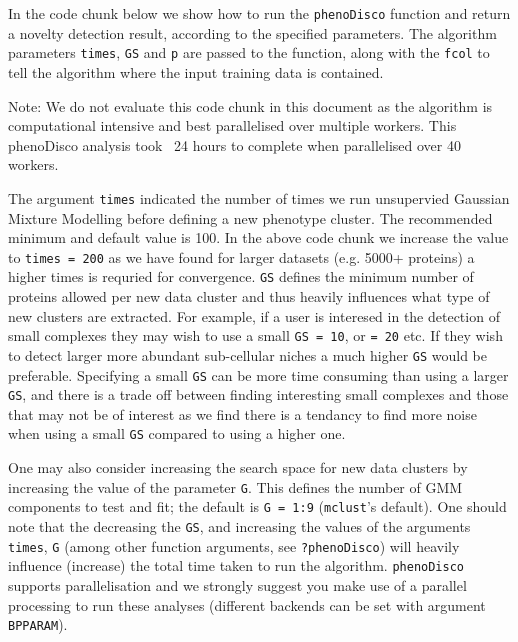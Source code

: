 In the code chunk below we show how to run the \texttt{phenoDisco}
function and return a novelty detection result, according to the
specified parameters. The algorithm parameters \texttt{times}, \texttt{GS} and \texttt{p}
are passed to the function, along with the \texttt{fcol} to tell the
algorithm where the input training data is contained. 

\begin{knitrout}
\color{fgcolor}\begin{kframe}
\begin{alltt}
 \hlkwb{<-}   \hlstd{=} \hlstd{,}
                  \hlstd{=} \hlstd{,}
                  \hlstd{=} \hlstd{)}
\end{alltt}
\end{kframe}
\end{knitrout}

Note: We do not evaluate this code chunk in this document as the
algorithm is computational intensive and best parallelised over
multiple workers. This phenoDisco analysis took ~24 hours to complete
when parallelised over 40 workers.

The argument \texttt{times} indicated the number of times we run unsupervied
Gaussian Mixture Modelling before defining a new phenotype cluster.
The recommended minimum and default value is 100. In the above code
chunk we increase the value to \texttt{times = 200} as we have found for
larger datasets (e.g. 5000+ proteins) a higher times is requried for
convergence. \texttt{GS} defines the minimum number of proteins allowed per
new data cluster and thus heavily influences what type of new clusters
are extracted. For example, if a user is interesed in the detection of
small complexes they may wish to use a small \texttt{GS = 10}, or \texttt{= 20} etc.
If they wish to detect larger more abundant sub-cellular niches a much
higher \texttt{GS} would be preferable. Specifying a small \texttt{GS} can be more
time consuming than using a larger \texttt{GS}, and there is a trade off
between finding interesting small complexes and those that may not be
of interest as we find there is a tendancy to find more noise when
using a small \texttt{GS} compared to using a higher one.

One may also consider increasing the search space for new data
clusters by increasing the value of the parameter \texttt{G}. This defines
the number of GMM components to test and fit; the default is \texttt{G = 1:9}
(\texttt{mclust}'s default). One should note that the decreasing the \texttt{GS},
and increasing the values of the arguments \texttt{times}, \texttt{G} (among other
function arguments, see \texttt{?phenoDisco}) will heavily influence
(increase) the total time taken to run the algorithm.  \texttt{phenoDisco}
supports parallelisation and we strongly suggest you make use of a
parallel processing to run these analyses (different backends can be
set with argument \texttt{BPPARAM}). 



